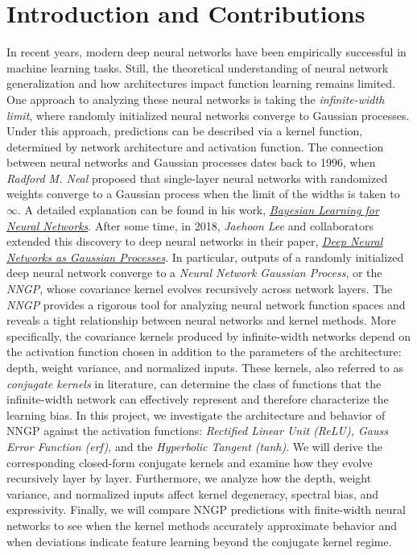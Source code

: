 \documentclass{article}
\newcommand{\NL}{\newline 
\newline}
\begin{document}
\section{Introduction and Contributions}
In recent years, modern deep neural networks have been empirically successful in machine learning tasks. Still, the theoretical understanding of neural network generalization and how architectures impact function learning remains limited. One approach to analyzing these neural networks is taking the \textit{infinite-width limit}, where randomly initialized neural networks converge to Gaussian processes. Under this approach, predictions can be described via a kernel function, determined by network architecture and activation function.
\NL
The connection between neural networks and Gaussian processes dates back to 1996, when \textit{Radford M. Neal} proposed that single-layer neural networks with randomized weights converge to a Gaussian process when the limit of the widths is taken to $\infty$. A detailed explanation can be found in his work, \href{https://glizen.com/radfordneal/bnn.book.html}{\textit{Bayesian Learning for Neural Networks}}. After some time, in 2018, \textit{Jaehoon Lee} and collaborators extended this discovery to deep neural networks in their paper, \href{https://arxiv.org/abs/1711.00165}{\textit{Deep Neural Networks as Gaussian Processes}}. In particular, outputs of a randomly initialized deep neural network converge to a \textit{Neural Network Gaussian Process}, or the \textit{NNGP}, whose covariance kernel evolves recursively across network layers.
\NL
The \textit{NNGP} provides a rigorous tool for analyzing neural network function spaces and reveals a tight relationship between neural networks and kernel methods. More specifically, the covariance kernels produced by infinite-width networks depend on the activation function chosen in addition to the parameters of the architecture: depth, weight variance, and normalized inputs. These kernels, also referred to as \textit{conjugate kernels} in literature, can determine the class of functions that the infinite-width network can effectively represent and therefore characterize the learning bias.
\NL
In this project, we investigate the architecture and behavior of NNGP against the activation functions: \textit{Rectified Linear Unit (ReLU), Gauss Error Function (erf)}, and the \textit{Hyperbolic Tangent (tanh)}. We will derive the corresponding closed-form conjugate kernels and examine how they evolve recursively layer by layer. Furthermore, we analyze how the depth, weight variance, and normalized inputs affect kernel degeneracy, spectral bias, and expressivity. Finally, we will compare NNGP predictions with finite-width neural networks to see when the kernel methods accurately approximate behavior and when deviations indicate feature learning beyond the conjugate kernel regime.
\end{document}
